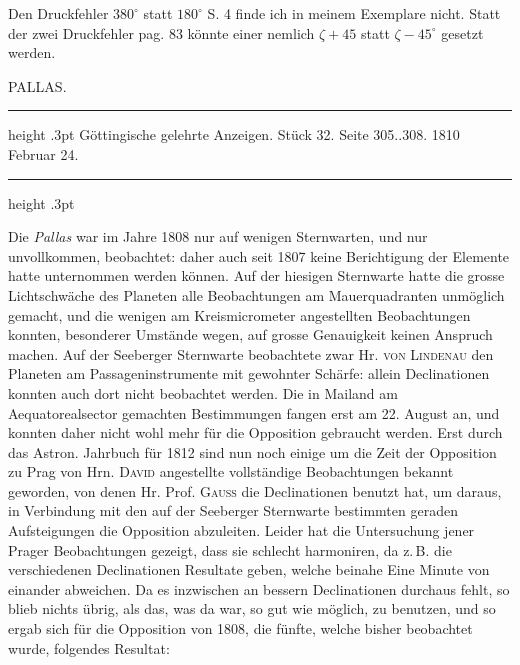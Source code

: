 \par\indent Den Druckfehler $380^\circ$ statt $180^\circ$ S. 4 finde ich in meinem Exemplare nicht. Statt der zwei Druckfehler pag. 83 könnte einer nemlich $\zeta+45$ statt $\zeta-45^\circ$ gesetzt werden.
\par\bigskip
{}
\begin{center}\large PALLAS.\end{center}
\begin{center}
\parbox{.81\linewidth}{%
\centering\fontsize{8.2}{10.2}\selectfont
\hrule height .3pt\relax\vspace{2.5pt}
Göttingische gelehrte Anzeigen. Stück 32. Seite 305..308. 1810 Februar 24.\par
\vspace{2.5pt}\hrule height .3pt\relax
}
\end{center}

\par\indent Die \emph{Pallas} war im Jahre 1808 nur auf wenigen Sternwarten, und nur unvollkommen, beobachtet: daher auch seit 1807 keine Berichtigung der Elemente hatte unternommen werden können. Auf der hiesigen Sternwarte hatte die grosse Lichtschwäche des Planeten alle Beobachtungen am Mauerquadranten unmöglich gemacht, und die wenigen am Kreismicrometer angestellten Beobachtungen konnten, besonderer Umstände wegen, auf grosse Genauigkeit keinen Anspruch machen. Auf der Seeberger Sternwarte beobachtete zwar Hr. \textsc{von Lindenau} den Planeten am Passageninstrumente mit gewohnter Schärfe: allein Declinationen konnten auch dort nicht beobachtet werden. Die in Mailand am Aequatorealsector gemachten Bestimmungen fangen erst am 22. August an, und konnten daher nicht wohl mehr für die Opposition gebraucht werden. Erst durch das Astron. Jahrbuch für 1812 sind nun noch einige um die Zeit der Opposition zu Prag von Hrn. \textsc{David} angestellte vollständige Beobachtungen bekannt geworden, von denen Hr. Prof. \textsc{Gauss} die Declinationen benutzt hat, um daraus, in Verbindung mit den auf der Seeberger Sternwarte bestimmten geraden Aufsteigungen die Opposition abzuleiten. Leider hat die Untersuchung jener Prager Beobachtungen gezeigt, dass sie schlecht harmoniren, da z.\,B. die verschiedenen Declinationen Resultate geben, welche beinahe Eine Minute von einander abweichen. Da es inzwischen an bessern Declinationen durchaus fehlt, so blieb nichts übrig, als das, was da war, so gut wie möglich, zu benutzen, und so ergab sich für die Opposition von 1808, die fünfte, welche bisher beobachtet wurde, folgendes Resultat:

